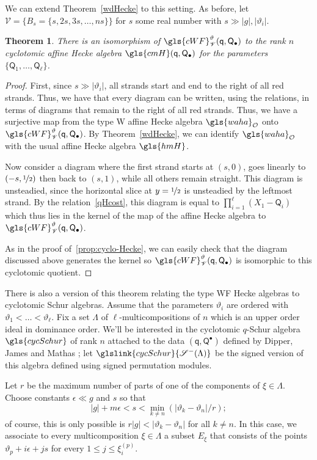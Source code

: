 \documentclass[10pt]{article}
\newtheorem{theorem}{Theorem}[section]
\theoremstyle{definition}
\newcommand{\wellsep}{\mathscr{V}}
\newcommand{\ck}{g}
\newcommand{\pq}{\mathsf{q}}
\newcommand{\PQ}{\mathsf{Q}}
\newcommand{\cO}{\mathcal{O}}
\newcommand{\waha}{\gls{waha}}
\newcommand{\hmH}{\gls{hmH}}
\begin{document}
We can extend Theorem~\ref{wdHecke} to this setting. As before, let
$\wellsep=\{B_s=\{s,2s,3s,\dots, ns\}\}$ for $s$ some real
number with $s\gg |\ck|,|\vartheta_i|$. 
\begin{theorem}\label{wfHecke}
 There is an isomorphism of $\gls{cWF}^\vartheta_\wellsep
 (\pq,\PQ_{\bullet})$ to the rank $n$ cyclotomic affine Hecke algebra
 $\gls{cmH}(\pq,\PQ_\bullet)$ for the 
 parameters $\{\PQ_1,\dots, \PQ_\ell\}$. 
\end{theorem}
\begin{proof}
 First, since $s\gg |\vartheta_i|$, all strands start and end to the
 right of all red strands. Thus, we have that every diagram can be
 written, using the relations, in terms of diagrams that remain to
 the right of all red strands. Thus, we have a surjective map from
 the type W affine Hecke algebra $\waha_\cO$ onto $\gls{cWF}^\vartheta_\wellsep
 (\pq,\PQ_{\bullet})$. 
By Theorem~\ref{wdHecke}, we can identify $\waha_\cO$ with the usual
affine Hecke algebra $\hmH$. 

Now consider a diagram
where the first strand starts at $(s,0)$, goes linearly to
$(-s,\nicefrac 12)$ then back to $(s,1)$, while all others remain
straight. This diagram is unsteadied, since the horizontal slice at
$y=\nicefrac{1}2$ is unsteadied by the leftmost strand. By the relation~\eqref{qHcost}, this diagram is equal to $\prod_{i=1}^\ell
 (X_1-\PQ_i)$ which thus lies in the kernel of the map of the affine
 Hecke algebra to $\gls{cWF}^\vartheta_\wellsep
 (\pq,\PQ_{\bullet})$. 

 As in the proof of~\ref{prop:cyclo-Hecke}, we can easily check that
 the diagram discussed above generates the kernel so $\gls{cWF}^\vartheta_\wellsep (\pq,\PQ_{\bullet})$ is isomorphic to
 this cyclotomic quotient.
\end{proof}

There is also a version of this theorem relating the type WF Hecke
algebras to cyclotomic Schur algebras. Assume that the parameters
$\vartheta_i$ are ordered with $\vartheta_1<\dots <\vartheta_\ell$.
Fix a set $\Lambda$ of $\ell$-multicompositions of $n$ which is an
upper order ideal in dominance order. We'll be interested in the
cyclotomic $q$-Schur algebra $\gls{cycSchur}$ of rank $n$ attached to the
data $(\pq,\PQ^\bullet)$ defined by Dipper, James and Mathas
\cite[6.1]{DJM}; let $ \glslink{cycSchur}{\mathscr{S}^-(\Lambda)}$ be the signed version of
this algebra defined using signed permutation modules.

Let $r$ be
the maximum number of parts of one of the components of $\xi\in
\Lambda$. Choose constants $\epsilon \ll \ck$ and $s$ so
that \[|\ck|+m\epsilon < s < \min_{k\neq
 n}(|\vartheta_k-\vartheta_n|/r);\] of course, this is only possible
is $r|\ck| <|\vartheta_k-\vartheta_n|$ for all $k\neq n$. In this
case, we associate to every multicomposition $\xi\in \Lambda$ a subset $E_\xi$
that consists of the points $\vartheta_p+i\epsilon+js$ for every
$1\leq j\leq \xi^{(p)}_i$.
\end{document}
